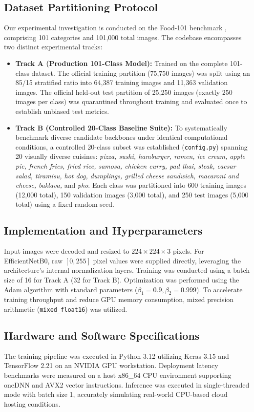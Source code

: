 \documentclass[conference]{IEEEtran}
\begin{document}
\subsection{Dataset Partitioning Protocol}
Our experimental investigation is conducted on the Food-101 benchmark \cite{food101}, comprising 101 categories and 101,000 total images. The codebase encompasses two distinct experimental tracks:
\begin{itemize}
    \item \textbf{Track A (Production 101-Class Model):} Trained on the complete 101-class dataset. The official training partition (75,750 images) was split using an 85/15 stratified ratio into 64,387 training images and 11,363 validation images. The official held-out test partition of 25,250 images (exactly 250 images per class) was quarantined throughout training and evaluated once to establish unbiased test metrics.
    \item \textbf{Track B (Controlled 20-Class Baseline Suite):} To systematically benchmark diverse candidate backbones under identical computational conditions, a controlled 20-class subset was established (\texttt{config.py}) spanning 20 visually diverse cuisines: \textit{pizza, sushi, hamburger, ramen, ice cream, apple pie, french fries, fried rice, samosa, chicken curry, pad thai, steak, caesar salad, tiramisu, hot dog, dumplings, grilled cheese sandwich, macaroni and cheese, baklava,} and \textit{pho}. Each class was partitioned into 600 training images (12,000 total), 150 validation images (3,000 total), and 250 test images (5,000 total) using a fixed random seed.
\end{itemize}

\subsection{Implementation and Hyperparameters}
Input images were decoded and resized to ${224 \times 224 \times 3}$ pixels. For EfficientNetB0, raw $[0, 255]$ pixel values were supplied directly, leveraging the architecture's internal normalization layers. Training was conducted using a batch size of 16 for Track A (32 for Track B). Optimization was performed using the Adam algorithm \cite{kingma2014adam} with standard parameters ($\beta_1 = 0.9, \beta_2 = 0.999$). To accelerate training throughput and reduce GPU memory consumption, mixed precision arithmetic (\texttt{mixed\_float16}) was utilized.

\subsection{Hardware and Software Specifications}
The training pipeline was executed in Python 3.12 utilizing Keras 3.15 and TensorFlow 2.21 on an NVIDIA GPU workstation. Deployment latency benchmarks were measured on a host x86\_64 CPU environment supporting oneDNN and AVX2 vector instructions. Inference was executed in single-threaded mode with batch size 1, accurately simulating real-world CPU-based cloud hosting conditions.
\end{document}
